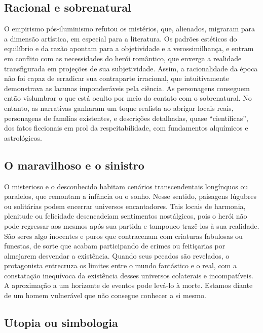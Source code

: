 \documentclass[12pt]{extarticle}
\begin{document}

\subsection{Racional e sobrenatural}

O empirismo pós-iluminismo refutou os mistérios, que, alienados,
migraram para a dimensão artística, em especial para a literatura. Os
padrões estéticos do equilíbrio e da razão apontam para a objetividade e
a verossimilhança, e entram em conflito com as necessidades do herói
romântico, que enxerga a realidade transfigurada em projeções de sua
subjetividade. Assim, a racionalidade da época não foi capaz de
erradicar sua contraparte irracional, que intuitivamente demonstrava as
lacunas imponderáveis pela ciência. As personagens conseguem então
vislumbrar o que está oculto por meio do contato com o sobrenatural. No
entanto, as narrativas ganharam um toque realista ao abrigar locais
reais, personagens de famílias existentes, e descrições detalhadas,
quase ``científicas'', dos fatos ficcionais em prol da respeitabilidade,
com fundamentos alquímicos e astrológicos.

\subsection{O maravilhoso e o sinistro}

O misterioso e o desconhecido habitam cenários transcendentais
longínquos ou paralelos, que remontam a infância ou o sonho. Nesse
sentido, paisagens lúgubres ou solitárias podem encerrar universos
encantadores. Tais locais de harmonia, plenitude ou felicidade
desencadeiam sentimentos nostálgicos, pois o herói não pode regressar
aos mesmos após sua partida e tampouco trazê-los à sua realidade. São
seres algo inocentes e puros que contracenam com criaturas fabulosas ou
funestas, de sorte que acabam participando de crimes ou feitiçarias por
almejarem desvendar a existência. Quando seus pecados são revelados, o
protagonista entrecruza os limites entre o mundo fantástico e o real,
com a constatação inequívoca da existência desses universos colaterais e
incompatíveis. A aproximação a um horizonte de eventos pode levá-lo à
morte. Estamos diante de um homem vulnerável que não consegue conhecer a
si mesmo.

\subsection{Utopia ou simbologia}
\end{document}
